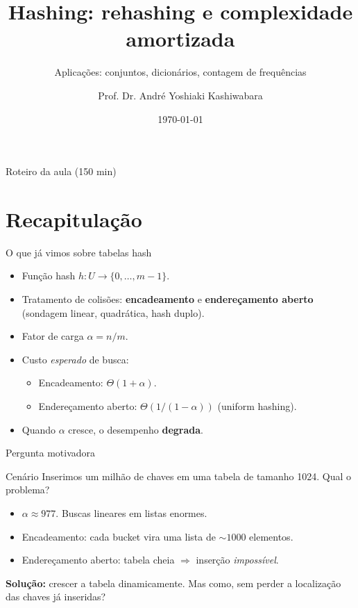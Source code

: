 \documentclass[aspectratio=169]{beamer}
\title{Hashing: rehashing e complexidade amortizada}
\subtitle{Aplicações: conjuntos, dicionários, contagem de frequências}
\author[André Y. Kashiwabara]{Prof. Dr. André Yoshiaki Kashiwabara}
\institute{UFS -- COMP0497 Estruturas de Dados}
\date{\today}
\begin{document}
\begin{frame}
    \titlepage
\end{frame}

\begin{frame}{Roteiro da aula (150 min)}
\tableofcontents
\end{frame}

\section{Recapitulação}

\begin{frame}{O que já vimos sobre tabelas hash}
\begin{itemize}
    \item Função hash $h: U \to \{0,\dots,m-1\}$.
    \item Tratamento de colisões: \textbf{encadeamento} e \textbf{endereçamento aberto}
    (sondagem linear, quadrática, hash duplo).
    \item Fator de carga $\alpha = n/m$.
    \item Custo \emph{esperado} de busca:
    \begin{itemize}
        \item Encadeamento: $\Theta(1 + \alpha)$.
        \item Endereçamento aberto: $\Theta(1/(1-\alpha))$ (uniform hashing).
    \end{itemize}
    \item Quando $\alpha$ cresce, o desempenho \textbf{degrada}.
\end{itemize}
\end{frame}

\begin{frame}{Pergunta motivadora}
\begin{block}{Cenário}
Inserimos um milhão de chaves em uma tabela de tamanho 1024. Qual o problema?
\end{block}
\bigskip
\begin{itemize}
    \item $\alpha \approx 977$. Buscas lineares em listas enormes.
    \item Encadeamento: cada bucket vira uma lista de $\sim 1000$ elementos.
    \item Endereçamento aberto: tabela cheia $\Rightarrow$ inserção \emph{impossível}.
\end{itemize}
\bigskip
\textbf{Solução:} crescer a tabela dinamicamente. Mas como, sem perder a localização
das chaves já inseridas?
\end{frame}
\end{document}
